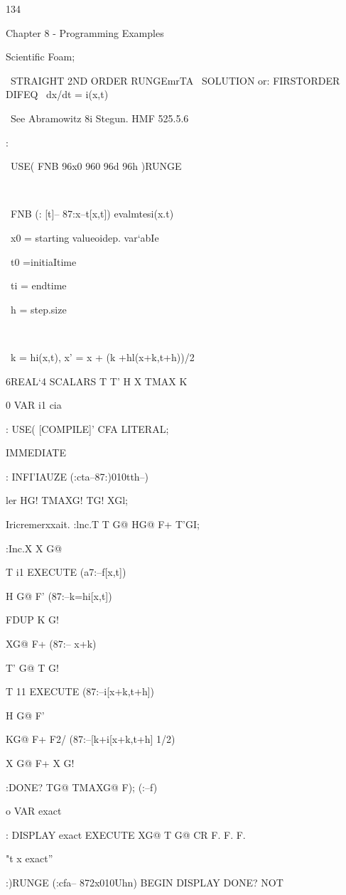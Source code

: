 {134

Chapter 8 - Programming Examples

Scientiﬁc Foam;

 

\ STRAIGHT 2ND ORDER RUNGEmrTA
\ SOLUTION or: FIRSTORDER DIFEQ
\ dx/dt = i(x,t)

\ See Abramowitz 8i Stegun. HMF 525.5.6

\Usege:

\ USE( FNB 96x0 960 96d 96h )RUNGE

\

\ FNB (: [t]-- 87:x--t[x,t]) evalmtesi(x.t)

\ x0 = starting valueoidep. var‘abIe

\ t0 =initiaItime

\ ti = endtime

\ h = step.size

\

\ k = hi(x,t), x' = x + (k +hl(x+k,t+h))/2

6REAL‘4 SCALARS T T' H X TMAX K

0 VAR i1 \tohoid cia

: USE( [COMPILE]' CFA LITERAL;

IMMEDIATE

: INFI'IAUZE (:cta--87:)010tth--)

ler HG! TMAXG! TG! XGl;

 

 

\Theeeworda Iricremerxxait.
:lnc.T T G@ HG@ F+ T'GI;

:Inc.X X G@

T i1 EXECUTE (a7:--f[x,t])

H G@ F' (87:--k=hi[x,t])

FDUP K G! \savek

XG@ F+ (87:-- x+k)

T' G@ T G!

T 11 EXECUTE (87:--i[x+k,t+h])

H G@ F'

KG@ F+ F2/
(87:--[k+i[x+k,t+h] 1/2)

X G@ F+ X G!

:DONE? TG@ TMAXG@ F); (:--f)

 

o VAR exact \cia

: DISPLAY exact EXECUTE
XG@ T G@ CR F. F. F.

\emit "t x exact”

:)RUNGE (:cfa-- 872x010Uhn)
BEGIN DISPLAY
DONE? NOT

}

